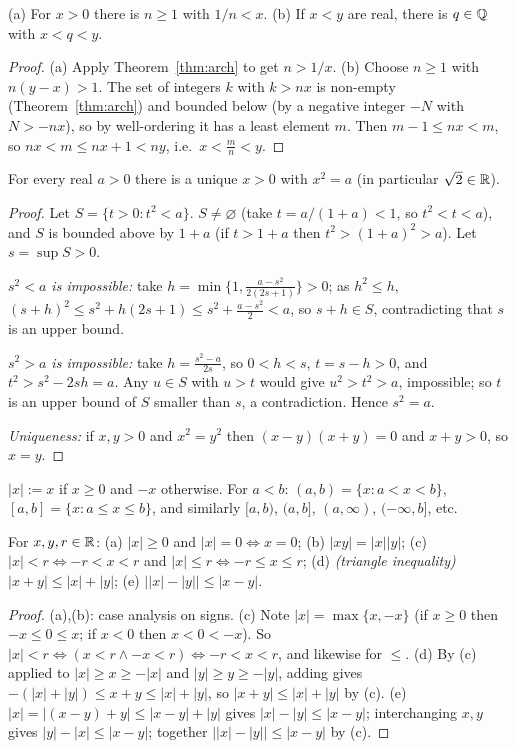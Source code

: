\begin{corollary}[Density of $\Q$]\label{cor:density}
	(a) For $x>0$ there is $n\ge1$ with $1/n<x$. (b) If $x<y$ are real, there is $q\in\mathbb{Q}$ with $x<q<y$.
\end{corollary}
\begin{proof}
	(a) Apply Theorem~\ref{thm:arch} to get $n>1/x$. (b) Choose $n\ge1$ with $n(y-x)>1$. The set of integers $k$ with $k>nx$ is non-empty (Theorem~\ref{thm:arch}) and bounded below (by a negative integer $-N$ with $N>-nx$), so by well-ordering it has a least element $m$. Then $m-1\le nx<m$, so $nx<m\le nx+1<ny$, i.e.\ $x<\frac mn<y$.
\end{proof}

\begin{theorem}\label{thm:sqrtexist}
	For every real $a>0$ there is a unique $x>0$ with $x^2=a$ (in particular $\sqrt2\in\mathbb{R}$).
\end{theorem}
\begin{proof}
	Let $S=\{t>0:t^2<a\}$. $S\ne\varnothing$ (take $t=a/(1+a)<1$, so $t^2<t<a$), and $S$ is bounded above by $1+a$ (if $t>1+a$ then $t^2>(1+a)^2>a$). Let $s=\sup S>0$.
	
	\emph{$s^2<a$ is impossible:} take $h=\min\{1,\frac{a-s^2}{2(2s+1)}\}>0$; as $h^2\le h$, $(s+h)^2\le s^2+h(2s+1)\le s^2+\frac{a-s^2}2<a$, so $s+h\in S$, contradicting that $s$ is an upper bound.
	
	\emph{$s^2>a$ is impossible:} take $h=\frac{s^2-a}{2s}$, so $0<h<s$, $t=s-h>0$, and $t^2>s^2-2sh=a$. Any $u\in S$ with $u>t$ would give $u^2>t^2>a$, impossible; so $t$ is an upper bound of $S$ smaller than $s$, a contradiction. Hence $s^2=a$.
	
	\emph{Uniqueness:} if $x,y>0$ and $x^2=y^2$ then $(x-y)(x+y)=0$ and $x+y>0$, so $x=y$.
\end{proof}

\begin{definition}
	$|x|:=x$ if $x\ge0$ and $-x$ otherwise. For $a<b$: $(a,b)=\{x:a<x<b\}$, $[a,b]=\{x:a\le x\le b\}$, and similarly $[a,b)$, $(a,b]$, $(a,\infty)$, $(-\infty,b]$, etc.
\end{definition}

\begin{proposition}\label{prop:abs}
	For $x,y,r\in\mathbb{R}$: (a) $|x|\ge0$ and $|x|=0\iff x=0$; (b) $|xy|=|x||y|$; (c) $|x|<r\iff-r<x<r$ and $|x|\le r\iff-r\le x\le r$; (d) \emph{(triangle inequality)} $|x+y|\le|x|+|y|$; (e) $\bigl||x|-|y|\bigr|\le|x-y|$.
\end{proposition}
\begin{proof}
	(a),(b): case analysis on signs. (c) Note $|x|=\max\{x,-x\}$ (if $x\ge0$ then $-x\le0\le x$; if $x<0$ then $x<0<-x$). So $|x|<r\iff(x<r\wedge-x<r)\iff-r<x<r$, and likewise for $\le$. (d) By (c) applied to $|x|\ge x\ge-|x|$ and $|y|\ge y\ge-|y|$, adding gives $-(|x|+|y|)\le x+y\le|x|+|y|$, so $|x+y|\le|x|+|y|$ by (c). (e) $|x|=|(x-y)+y|\le|x-y|+|y|$ gives $|x|-|y|\le|x-y|$; interchanging $x,y$ gives $|y|-|x|\le|x-y|$; together $\bigl||x|-|y|\bigr|\le|x-y|$ by (c).
\end{proof}